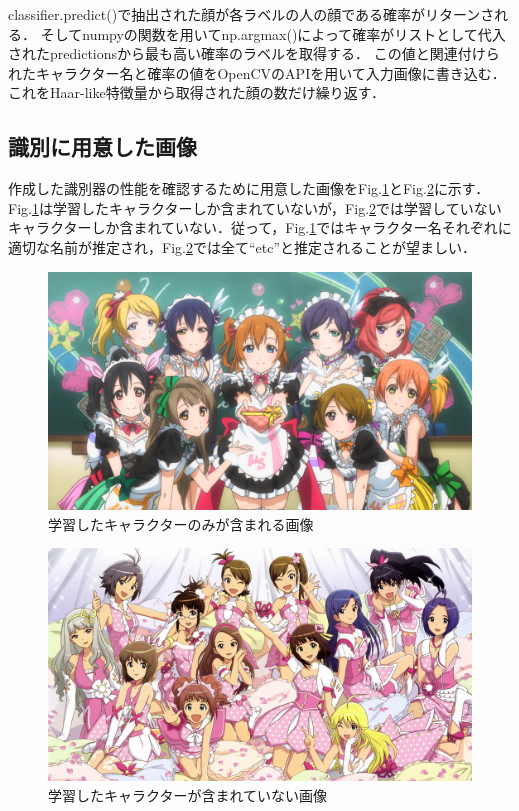 \documentclass[a4paper,10pt]{jsarticle}
\begin{document}
classifier.predict()で抽出された顔が各ラベルの人の顔である確率がリターンされる．
そしてnumpyの関数を用いてnp.argmax()によって確率がリストとして代入されたpredictionsから最も高い確率のラベルを取得する．
この値と関連付けられたキャラクター名と確率の値をOpenCVのAPIを用いて入力画像に書き込む．
これをHaar-like特徴量から取得された顔の数だけ繰り返す．

\subsection{識別に用意した画像}
作成した識別器の性能を確認するために用意した画像をFig.\ref{224542_17Jul15}とFig.\ref{224550_17Jul15}に示す．Fig.\ref{224542_17Jul15}は学習したキャラクターしか含まれていないが，Fig.\ref{224550_17Jul15}では学習していないキャラクターしか含まれていない．従って，Fig.\ref{224542_17Jul15}ではキャラクター名それぞれに適切な名前が推定され，Fig.\ref{224550_17Jul15}では全て``etc''と推定されることが望ましい．

\begin{figure}[p]
 \centering
 \includegraphics[width=140mm, bb = 0 0 1920 1080]{fig/jpg/lovelive.jpg}
 \caption{学習したキャラクターのみが含まれる画像 }
 \label{224542_17Jul15}
\end{figure}
\begin{figure}[bt]
 \centering
 \includegraphics[width=140mm]{fig/jpg/idolmaster.jpg}
 \caption{学習したキャラクターが含まれていない画像 }
 \label{224550_17Jul15}
\end{figure}
\end{document}
